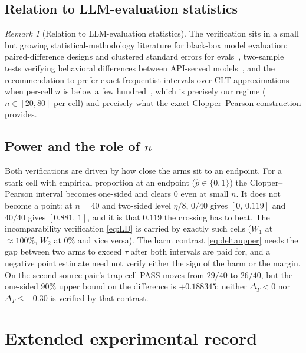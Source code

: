 \documentclass[11pt]{article}
\theoremstyle{plain}
\theoremstyle{definition}
\theoremstyle{remark}
\newtheorem{remark}{Remark}
\begin{document}
\subsection*{Relation to LLM-evaluation statistics}
\begin{remark}[Relation to LLM-evaluation statistics]
\label{rem:evalstats}
The verification sits in a small but growing statistical-methodology literature for black-box
model evaluation: paired-difference designs and clustered standard errors for
evals~\citep{miller2024errorbars}, two-sample tests verifying behavioral differences between
API-served models~\citep{gao2024modelequality}, and the recommendation to prefer exact
frequentist intervals over CLT approximations when per-cell $n$ is below a few
hundred~\citep{bowyer2025clt}, which is precisely our regime ($n \in [20,80]$ per cell) and
precisely what the exact Clopper--Pearson construction provides.
\end{remark}

\subsection*{Power and the role of \texorpdfstring{$n$}{n}}
\label{subsec:power}

Both verifications are driven by how close the arms sit to an endpoint. For a stark cell with
empirical proportion at an endpoint ($\hat p\in\{0,1\}$) the Clopper--Pearson interval becomes
one-sided and clears $0$ even at small $n$. It does not become a point: at $n=40$ and two-sided
level $\eta/8$, $0/40$ gives $[0,\,0.119]$ and $40/40$ gives $[0.881,\,1]$, and it is that
$0.119$ the crossing has to beat. The incomparability verification
\eqref{eq:LD} is carried by exactly such cells ($W_1$ at $\approx100\%$, $W_2$ at $0\%$ and vice
versa). The harm contrast \eqref{eq:deltaupper} needs the gap between two arms to exceed $\tau$
after both intervals are paid for, and a negative point estimate need not verify either the sign
of the harm or the margin. On the second source pair's trap cell PASS moves from $29/40$ to
$26/40$, but the one-sided $90\%$ upper bound on the difference is $+0.188345$: neither
$\Delta_T<0$ nor $\Delta_T\le-0.30$ is verified by that contrast.


\section{Extended experimental record}
\label{app:record}
\end{document}
